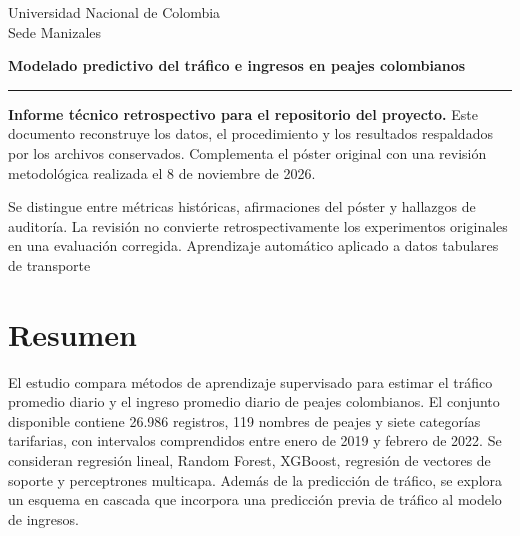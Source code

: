 \documentclass[11pt,a4paper]{article}
\begin{document}
\hypersetup{pageanchor=false}
\begin{titlepage}\raggedright{}
\vspace*{1.7cm}
{\color{azul}\Large Universidad Nacional de Colombia\\[3pt]Sede Manizales}\par
\vspace{1.7cm}
{\color{azul}\Huge\bfseries Modelado predictivo del tráfico e ingresos en peajes colombianos}\par
\vspace{.5cm}{\Large Comparación de regresión, ensambles y redes neuronales}\par
\vspace{1cm}{\large Bamsi Mendez Posada\\Ciencias de la Computación}\par
\vspace{.8cm}{\large Primer póster: Workshop Nuevas Tendencias en Estadística, 2025}\par
\vspace{1cm}\hrule\vspace{.5cm}
\textbf{Informe técnico retrospectivo para el repositorio del proyecto.}
Este documento reconstruye los datos, el procedimiento y los resultados respaldados por los archivos conservados. Complementa el póster original con una revisión metodológica realizada el 8 de noviembre de 2026.

Se distingue entre métricas históricas, afirmaciones del póster y hallazgos de auditoría. La revisión no convierte retrospectivamente los experimentos originales en una evaluación corregida.
\vfill
{\color{azul}\large Aprendizaje automático aplicado a datos tabulares de transporte}\par
\end{titlepage}
\hypersetup{pageanchor=true}

\section*{Resumen}
El estudio compara métodos de aprendizaje supervisado para estimar el tráfico promedio diario y el ingreso promedio diario de peajes colombianos. El conjunto disponible contiene 26.986 registros, 119 nombres de peajes y siete categorías tarifarias, con intervalos comprendidos entre enero de 2019 y febrero de 2022. Se consideran regresión lineal, Random Forest, XGBoost, regresión de vectores de soporte y perceptrones multicapa. Además de la predicción de tráfico, se explora un esquema en cascada que incorpora una predicción previa de tráfico al modelo de ingresos.
\end{document}
